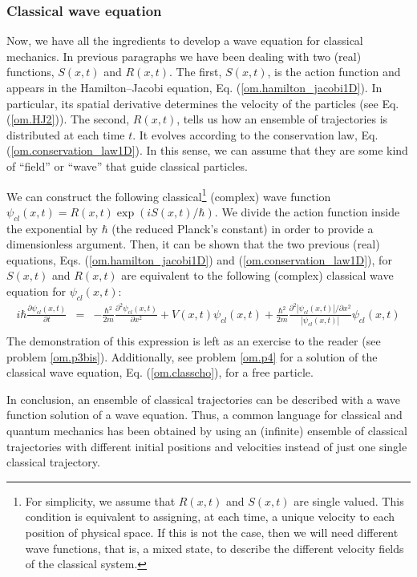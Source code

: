 \documentclass[nofootinbib, secnumarabic, amsmath, nobibnotes,10pt,aps,pra]{revtex4-1}
\newcommand{\eref}[1]{Eq. (\ref{#1})}
\begin{document}
\subsubsection{Classical wave equation}

Now, we have all the ingredients to develop a wave equation for classical mechanics. In previous paragraphs we have been dealing with two (real) functions, $S(x,t)$ and $R(x,t)$. The first, $S(x,t)$, is the action function and appears in the Hamilton--Jacobi equation, \eref{om.hamilton_jacobi1D}. In particular, its spatial derivative determines the velocity of the particles (see \eref{om.HJ2}). The second, $R(x,t)$, tells us how an ensemble of trajectories is distributed at each time $t$. It evolves according to the conservation law, \eref{om.conservation_law1D}. In this sense, we can assume that they are some kind of ``field'' or ``wave'' that guide classical particles.

We can construct the following classical\footnote{For simplicity, we assume that $R(x,t)$ and $S(x,t)$ are single valued. This condition is equivalent to assigning, at each time, a unique velocity to each position of physical space. If this is not the case, then we will need different wave functions, that is, a mixed state, to describe the different velocity fields of the classical system.} (complex) wave function $\psi_{cl}(x,t) = R(x,t) \exp(i S(x,t)/\hbar)$.
We divide the action function inside the exponential by $\hbar$ (the reduced Planck's constant) in order to provide a dimensionless argument.
Then, it can be shown that the two previous (real) equations, Eqs. (\ref{om.hamilton_jacobi1D}) and (\ref{om.conservation_law1D}), for $S(x,t)$ and $R(x,t)$ are equivalent to the following (complex) classical wave equation for $\psi_{cl}(x,t)$:
\begin{eqnarray}
\label{om.classcho}
i \hbar \frac{ \partial \psi_{cl}(x,t)} {\partial t} &=& -\frac {\hbar^2}{2m} \frac{ {\partial}^2 \psi_{cl}(x,t)} {\partial x^2} + V(x,t) \psi_{cl}(x,t)+ \frac {\hbar^{2}} {2 m} \frac { {\partial}^2 |\psi_{cl}(x,t)|/ \partial x^2}{|\psi_{cl}(x,t)|} \psi_{cl}(x,t)\nonumber\\
\end{eqnarray}
The demonstration of this expression is left as an exercise to the
reader (see problem \ref{om.p3bis}). Additionally, see problem
\ref{om.p4} for a solution of the classical wave equation,
\eref{om.classcho}, for a free particle.

In conclusion, an ensemble of classical trajectories can be described with a wave function solution of a wave equation.
Thus, a common language for classical and quantum mechanics has been obtained by using an (infinite) ensemble of classical trajectories with different initial positions and velocities instead of just one single classical trajectory.
\end{document}
